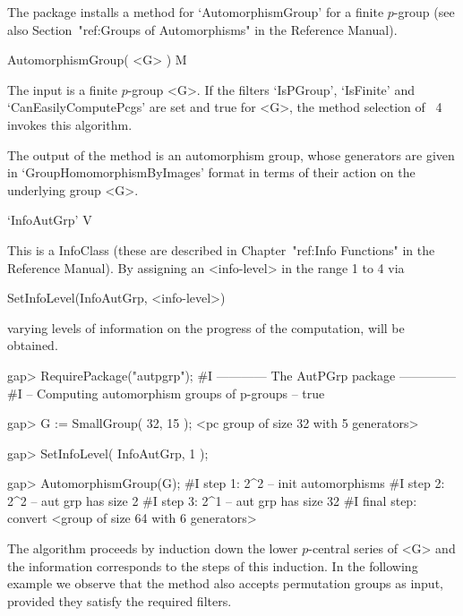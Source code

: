 

The {\AutPGrp} package installs a method for `AutomorphismGroup' for a 
finite $p$-group (see also Section~"ref:Groups of Automorphisms" 
in the {\GAP} Reference Manual).

\> AutomorphismGroup( <G> )   M 

The input is a finite $p$-group <G>. If the filters `IsPGroup', 
`IsFinite' and `CanEasilyComputePcgs' are set and true for <G>, 
the method selection of {\GAP}~4 invokes this algorithm. 

The output of the method is an automorphism group, whose generators 
are given in `GroupHomomorphismByImages' format in terms of their action 
on the underlying group <G>. 

\>`InfoAutGrp' V

This is a {\GAP} InfoClass (these are described in Chapter~"ref:Info
Functions" in the {\GAP} Reference Manual). By assigning an <info-level>
in the range 1 to 4 via

SetInfoLevel(InfoAutGrp, <info-level>)

varying levels of information on the progress of 
the computation, will be obtained. 

\beginexample 
gap> RequirePackage("autpgrp");
#I ------------ The AutPGrp package --------------
#I -- Computing automorphism groups of p-groups -- 
true

gap> G := SmallGroup( 32, 15 );
<pc group of size 32 with 5 generators>

gap> SetInfoLevel( InfoAutGrp, 1 );

gap> AutomorphismGroup(G);
#I  step 1: 2^2 -- init automorphisms 
#I  step 2: 2^2 -- aut grp has size 2
#I  step 3: 2^1 -- aut grp has size 32
#I  final step: convert
<group of size 64 with 6 generators>
\endexample

The algorithm proceeds by induction down the lower $p$-central
series of <G> and the information corresponds 
to the steps of this induction. In the following example we observe
that the method also accepts permutation groups as input, provided
they satisfy the required filters.

